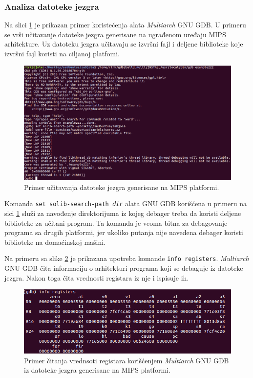 \documentclass[12pt,oneside]{memoir}
\begin{document}
\subsubsection{Analiza datoteke jezgra}

Na slici \ref{fig:core1} je prikazan primer koristećenja alata \emph{Multiarch} GNU GDB. U primeru se vrši učitavanje datoteke jezgra generisane na ugrađenom uređaju MIPS arhitekture. Uz datoteku jezgra učitavaju se izvršni fajl i deljene biblioteke koje izvršni fajl koristi na ciljanoj platfomi.

\begin{figure}[h!]
	\begin{center}
		\includegraphics[scale=0.4]{slike/core1.png}
	\end{center}
	\caption{Primer učitavanja datoteke jezgra generisane na MIPS platformi.}
	\label{fig:core1}
\end{figure}

Komanda \texttt{set solib-search-path \emph{dir}} alata GNU GDB korišćena u primeru na sici \ref{fig:core1} služi za navođenje direktorijuma iz kojeg debager treba da koristi deljene biblioteke za učitani program. Ta komanda je veoma bitna za debagovanje programa sa drugih platformi, jer ukoliko putanja nije navedena debager koristi biblioteke na domaćinskoj mašini.

Na primeru sa slike \ref{fig:core2} je prikazana upotreba komande \texttt{info registers}. \emph{Multiarch} GNU GDB čita informaciju o arhitekturi programa koji se debaguje iz datoteke jezgra. Nakon toga čita vrednosti registara iz nje i ispisuje ih.

\begin{figure}[h!]
	\begin{center}
		\includegraphics[scale=0.5]{slike/core2.png}
	\end{center}
	\caption{Primer čitanja vrednsoti registara korišćenjem \emph{Multiarch} GNU GDB iz datoteke jezgra generisane na MIPS platformi.}
	\label{fig:core2}
\end{figure}
\end{document}
